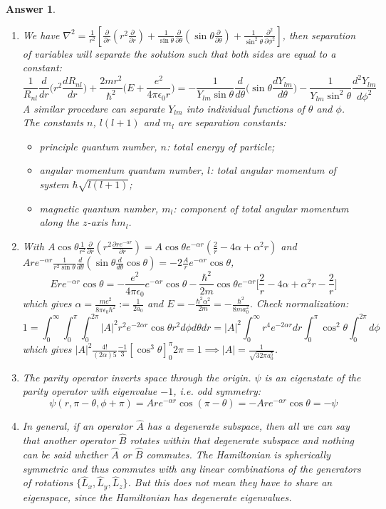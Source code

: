 \documentclass[a4paper]{article}
\newtheorem{ans}{Answer}[subsection]
\theoremstyle{new}
\begin{document}
\begin{ans}\leavevmode
\begin{enumerate}[label=(\roman*)]
\item We have $\nabla^2=\frac{1}{r^2}[\frac{\partial}{\partial r}(r^2\frac{\partial}{\partial r})+\frac{1}{\sin\theta}\frac{\partial}{\partial\theta}(\sin\theta\frac{\partial}{\partial\theta})+\frac{1}{\sin^2\theta}\frac{\partial^2}{\partial\phi^2}]$, then separation of variables will separate the solution such that both sides are equal to a constant:
$$\frac{1}{R_{nl}}\frac{d}{dr}\bigg(r^2\frac{dR_{nl}}{dr}\bigg)+\frac{2mr^2}{\hbar^2}\bigg(E+\frac{e^2}{4\pi\epsilon_0r}\bigg)=-\frac{1}{Y_{lm}\sin\theta}\frac{d}{d\theta}\bigg(\sin\theta\frac{dY_{lm}}{d\theta}\bigg)-\frac{1}{Y_{lm}\sin^2\theta}\frac{d^2Y_{lm}}{d\phi^2}$$
A similar procedure can separate $Y_{lm}$ into individual functions of $\theta$ and $\phi$. The constants $n$, $l(l+1)$ and $m_l$ are separation constants:
\begin{itemize}
    \item principle quantum number, $n$: total energy of particle;
    \item angular momentum quantum number, $l$: total angular momentum of system $\hbar\sqrt{l(l+1)}$;
    \item magnetic quantum number, $m_l$: component of total angular momentum along the $z$-axis $\hbar m_l$.
\end{itemize}
\item With $A\cos\theta\frac{1}{r^2}\frac{\partial}{\partial r}(r^2\frac{\partial re^{-\alpha r}}{\partial r})=A\cos\theta e^{-\alpha r}(\frac{2}{r}-4\alpha+\alpha^2r)$ and $Are^{-\alpha r}\frac{1}{r^2\sin\theta}\frac{d}{d\theta}(\sin\theta\frac{d}{d\theta}\cos\theta)=-2\frac{A}{r}e^{-\alpha r}\cos\theta$,
$$Ere^{-\alpha r}\cos\theta=-\frac{e^2}{4\pi\epsilon_0}e^{-\alpha r}\cos\theta-\frac{\hbar^2}{2m}\cos\theta e^{-\alpha r}\bigg[\frac{2}{r}-4\alpha+\alpha^2r-\frac{2}{r}\bigg]$$
which gives $\alpha=\frac{me^2}{8\pi\epsilon_0\hbar^2}:=\frac{1}{2a_0}$ and $E=-\frac{\hbar^2\alpha^2}{2m}=-\frac{\hbar^2}{8ma_0^2}$. Check normalization:
$$1=\int_0^\infty\int_0^\pi\int_0^{2\pi}|A|^2r^2e^{-2\alpha r}\cos\theta r^2d\phi d\theta dr=|A|^2\int_0^\infty r^4e^{-2\alpha r}dr\int_0^\pi \cos^2\theta\int_0^{2\pi}d\phi$$
which gives $|A|^2\frac{4!}{(2\alpha)5}\frac{-1}{3}[\cos^3\theta]_0^\pi 2\pi=1\implies|A|=\frac{1}{\sqrt{32\pi a_0^5}}$.
\item The parity operator inverts space through the origin. $\psi$ is an eigenstate of the parity operator with eigenvalue $-1$, i.e. odd symmetry:
$$\psi(r,\pi-\theta,\phi+\pi)=Are^{-\alpha r}\cos(\pi-\theta)=-Are^{-\alpha r}\cos\theta=-\psi$$
\item In general, if an operator $\hat{A}$ has a degenerate subspace, then all we can say that another operator $\hat{B}$ rotates within that degenerate subspace and nothing can be said whether $\hat{A}$ or $\hat{B}$ commutes. The Hamiltonian is spherically symmetric and thus commutes with any linear combinations of the generators of rotations $\{\hat{L}_x,\hat{L}_y,\hat{L}_z\}$. But this does not mean they have to share an eigenspace, since the Hamiltonian has degenerate eigenvalues.
\end{enumerate}
\end{ans}
\end{document}
